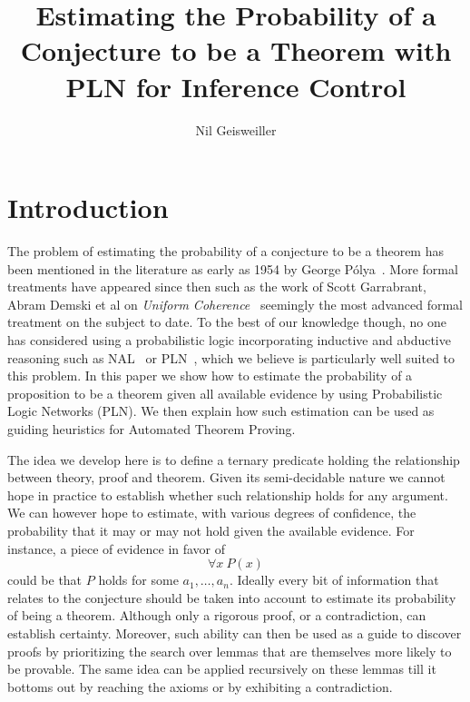 \documentclass{easychair}
\title{Estimating the Probability of a Conjecture to be a Theorem with
  PLN for Inference Control}
\author{Nil Geisweiller}
\institute{
  SingularityNET Foundation,\\
  Zug, Switzerland\\
  \email{nil@singularitynet.io}
}
\begin{document}
\maketitle


\section{Introduction}

The problem of estimating the probability of a conjecture to be a
theorem has been mentioned in the literature as early as 1954 by
George P\'olya~\cite{Polya1954}.  More formal treatments have appeared
since then such as the work of Scott Garrabrant, Abram Demski et al on
\emph{Uniform Coherence}~\cite{Garrabrant2016, Abram2016} seemingly
the most advanced formal treatment on the subject to date.  To the
best of our knowledge though, no one has considered using a
probabilistic logic incorporating inductive and abductive reasoning
such as NAL~\cite{Wang2013} or PLN~\cite{Goertzel09PLN}, which we
believe is particularly well suited to this problem.  In this paper we
show how to estimate the probability of a proposition to be a theorem
given all available evidence by using Probabilistic Logic Networks
(PLN).  We then explain how such estimation can be used as guiding
heuristics for Automated Theorem Proving.

The idea we develop here is to define a ternary predicate holding the
relationship between theory, proof and theorem.  Given its
semi-decidable nature we cannot hope in practice to establish whether
such relationship holds for any argument.  We can however hope to
estimate, with various degrees of confidence, the probability that it
may or may not hold given the available evidence.  For instance, a
piece of evidence in favor of
$$\forall x \ P(x)$$ could be that $P$ holds for some $a_1, \dots,
a_n$.  Ideally every bit of information that relates to the conjecture
should be taken into account to estimate its probability of being a
theorem.  Although only a rigorous proof, or a contradiction, can
establish certainty.  Moreover, such ability can then be used as a
guide to discover proofs by prioritizing the search over lemmas that
are themselves more likely to be provable.  The same idea can be
applied recursively on these lemmas till it bottoms out by reaching
the axioms or by exhibiting a contradiction.
\end{document}
